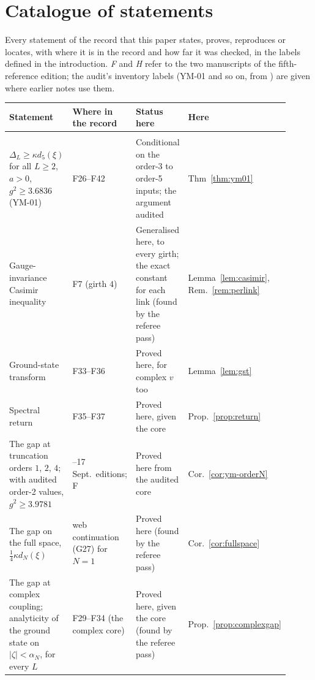 \section{Catalogue of statements}\label{app:catalogue}

Every statement of the record that this paper states, proves, reproduces or locates, with where it is in the record and how far it was checked, in the labels defined in the introduction. \emph{F} and \emph{H} refer to the two manuscripts of the fifth-reference edition; the audit's inventory labels (YM-01 and so on, from ) are given where earlier notes use them.

\begin{center}\small
\begin{longtable}{@{}>{\raggedright\arraybackslash}p{0.36\linewidth}>{\raggedright\arraybackslash}p{0.22\linewidth}>{\raggedright\arraybackslash}p{0.22\linewidth}>{\raggedright\arraybackslash}p{0.11\linewidth}@{}}
\toprule
Statement & Where in the record & Status here & Here\\
\midrule
\endhead
\multicolumn{4}{@{}l}{\emph{The strong-coupling gap (fifth reference)}}\\*
$\Delta_L\ge\kappa d_5(\xi)$ for all $L\ge2$, $a>0$, $g^2\ge3.6836$ (YM-01) & F26--F42 & Conditional on the order-3 to order-5 inputs; the argument audited & Thm~\ref{thm:ym01}\\
Gauge-invariance Casimir inequality & F7 (girth $4$) & Generalised here, to every girth; the exact constant for each link (found by the referee pass) & Lemma~\ref{lem:casimir}, Rem.~\ref{rem:perlink}\\
Ground-state transform & F33--F36 & Proved here, for complex $v$ too & Lemma~\ref{lem:gst}\\
Spectral return & F35--F37 & Proved here, given the core & Prop.~\ref{prop:return}\\
The gap at truncation orders $1$, $2$, $4$; with audited order-2 values, $g^2\ge3.9781$ & 14--17 Sept.\ editions; F & Proved here from the audited core & Cor.~\ref{cor:ym-orderN}\\
The gap on the full space, $\frac14\kappa d_N(\xi)$ & web continuation (G27) for $N=1$ & Proved here (found by the referee pass) & Cor.~\ref{cor:fullspace}\\
The gap at complex coupling; analyticity of the ground state on $|\zeta|<\alpha_N$, for every $L$ & F29--F34 (the complex core) & Proved here, given the core (found by the referee pass) & Prop.~\ref{prop:complexgap}\\

\end{longtable}
\end{center}
